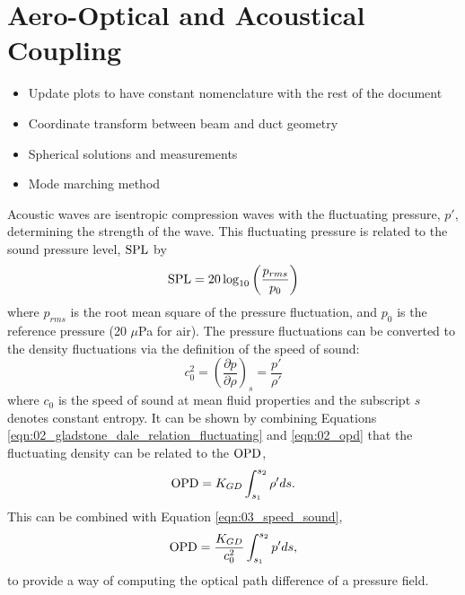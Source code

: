 
\chapter{Aero-Optical and Acoustical Coupling}

\begin{itemize}
  \color{red}
  \item Update plots to have constant nomenclature with the rest of the document
  \item Coordinate transform between beam and duct geometry
  \item Spherical solutions and measurements
  \item Mode marching method
\end{itemize}


Acoustic waves are isentropic compression waves with the fluctuating pressure, $p'$, determining the strength of the wave.
This fluctuating pressure is related to the sound pressure level, $\operatorname{SPL}$ by
\begin{equation}
  \operatorname{SPL} = 20\log_{10}\left(\frac{p_{rms}}{p_0}\right)
  \label{eqn:03_spl}
\end{equation}
where $p_{rms}$ is the root mean square of the pressure fluctuation, and $p_0$ is the reference pressure (20 $\mu$Pa for air).
The pressure fluctuations can be converted to the density fluctuations via the definition of the speed of sound:
\begin{equation}
  c_0^2 = \left(\frac{\partial p}{\partial \rho}\right)_s=\frac{p'}{\rho'}
  \label{eqn:03_speed_sound}
\end{equation}
where $c_0$ is the speed of sound at mean fluid properties and the subscript $s$ denotes constant entropy.
It can be shown by combining Equations \ref{eqn:02_gladstone_dale_relation_fluctuating} and \ref{eqn:02_opd} that the fluctuating density can be related to the $\operatorname{OPD}$,
\begin{equation}
  \operatorname{OPD} = K_{GD}\int_{s_1}^{s_2}{\rho'}ds \textrm{.}
  \label{eqn:03_opd_fluct}
\end{equation}
This can be combined with Equation \ref{eqn:03_speed_sound},
\begin{equation}
  \operatorname{OPD} = \frac{K_{GD}}{c_0^2}\int_{s_1}^{s_2}{p'}ds \textrm{,}
  \label{eqn:03_opd_pressure}
\end{equation}
to provide a way of computing the optical path difference of a pressure field.

